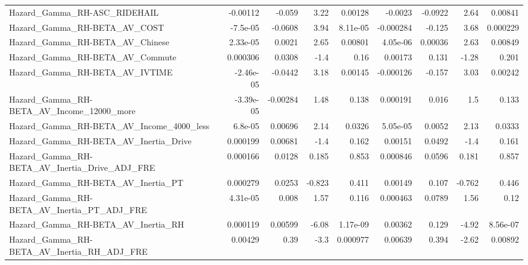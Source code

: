 \begin{tabular}{lrrrrrrrr}
Hazard\_Gamma\_RH-ASC\_RIDEHAIL                       &    -0.00112 &       -0.059 &     3.22 &  0.00128 &    -0.0023 &     -0.0922 &         2.64 &       0.00841 \\
Hazard\_Gamma\_RH-BETA\_AV\_COST                       &    -7.5e-05 &      -0.0608 &     3.94 & 8.11e-05 &  -0.000284 &      -0.125 &         3.68 &      0.000229 \\
Hazard\_Gamma\_RH-BETA\_AV\_Chinese                    &    2.33e-05 &       0.0021 &     2.65 &  0.00801 &   4.05e-06 &     0.00036 &         2.63 &       0.00849 \\
Hazard\_Gamma\_RH-BETA\_AV\_Commute                    &    0.000306 &       0.0308 &     -1.4 &     0.16 &    0.00173 &       0.131 &        -1.28 &         0.201 \\
Hazard\_Gamma\_RH-BETA\_AV\_IVTIME                     &   -2.46e-05 &      -0.0442 &     3.18 &  0.00145 &  -0.000126 &      -0.157 &         3.03 &       0.00242 \\
Hazard\_Gamma\_RH-BETA\_AV\_Income\_12000\_more          &   -3.39e-05 &     -0.00284 &     1.48 &    0.138 &   0.000191 &       0.016 &          1.5 &         0.133 \\
Hazard\_Gamma\_RH-BETA\_AV\_Income\_4000\_less           &     6.8e-05 &      0.00696 &     2.14 &   0.0326 &   5.05e-05 &      0.0052 &         2.13 &        0.0333 \\
Hazard\_Gamma\_RH-BETA\_AV\_Inertia\_Drive              &    0.000199 &      0.00681 &     -1.4 &    0.162 &    0.00151 &      0.0492 &         -1.4 &         0.161 \\
Hazard\_Gamma\_RH-BETA\_AV\_Inertia\_Drive\_ADJ\_FRE      &    0.000166 &       0.0128 &    0.185 &    0.853 &   0.000846 &      0.0596 &        0.181 &         0.857 \\
Hazard\_Gamma\_RH-BETA\_AV\_Inertia\_PT                 &    0.000279 &       0.0253 &   -0.823 &    0.411 &    0.00149 &       0.107 &       -0.762 &         0.446 \\
Hazard\_Gamma\_RH-BETA\_AV\_Inertia\_PT\_ADJ\_FRE         &    4.31e-05 &        0.008 &     1.57 &    0.116 &   0.000463 &      0.0789 &         1.56 &          0.12 \\
Hazard\_Gamma\_RH-BETA\_AV\_Inertia\_RH                 &    0.000119 &      0.00599 &    -6.08 & 1.17e-09 &    0.00362 &       0.129 &        -4.92 &      8.56e-07 \\
Hazard\_Gamma\_RH-BETA\_AV\_Inertia\_RH\_ADJ\_FRE         &     0.00429 &         0.39 &     -3.3 & 0.000977 &    0.00639 &       0.394 &        -2.62 &       0.00892 \\

\end{tabular}
